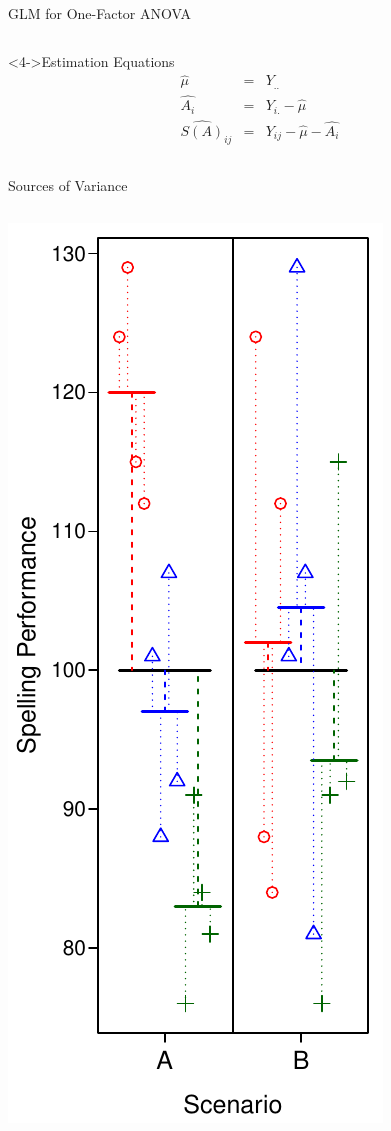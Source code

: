 \documentclass[presentation]{beamer}
\begin{document}
\begin{frame}[label={sec:orga7d2341}]{GLM for One-Factor ANOVA}
\begin{columns}
\begin{column}[t]{.7\columnwidth}
\begin{block}<4->{Estimation Equations}
\begin{eqnarray*}
\hat{\mu} &=& Y_{..} \\
\hat{A_i} &=& Y_{i.}-\hat{\mu}\\
\widehat{S(A)}_{ij} &=& Y_{ij} - \hat{\mu} - \hat{A_i}
\end{eqnarray*}
\end{block}

\end{column}
\end{columns}
\end{frame}

\begin{frame}[label={sec:orgfb5bcf0}]{Sources of Variance}
\begin{columns}
\begin{column}{.3\columnwidth}
\includegraphics[scale=.5]{08_glm_img/spelling-05.pdf}
\end{column}


\end{columns}
\end{frame}
\end{document}
